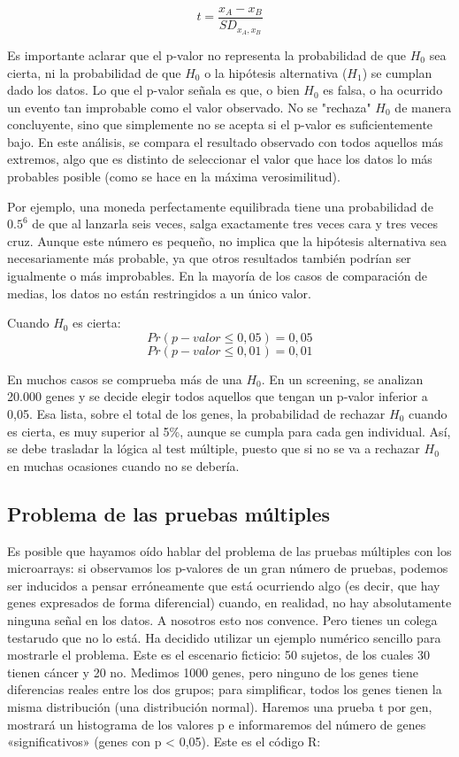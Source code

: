 \documentclass{config/apuntes}\usepackage[]{graphicx}\usepackage[]{xcolor}
\begin{document}
\[
t = \frac{x_A - x_B}{SD_{x_A, x_B}}
\]

Es importante aclarar que el p-valor no representa la probabilidad de que $H_0$ sea cierta, ni la probabilidad de que $H_0$ o la hipótesis alternativa ($H_1$) se cumplan dado los datos. Lo que el p-valor señala es que, o bien $H_0$ es falsa, o ha ocurrido un evento tan improbable como el valor observado. No se "rechaza" $H_0$ de manera concluyente, sino que simplemente no se acepta si el p-valor es suficientemente bajo. En este análisis, se compara el resultado observado con todos aquellos más extremos, algo que es distinto de seleccionar el valor que hace los datos lo más probables posible (como se hace en la máxima verosimilitud).

Por ejemplo, una moneda perfectamente equilibrada tiene una probabilidad de $0.5^6$ de que al lanzarla seis veces, salga exactamente tres veces cara y tres veces cruz. Aunque este número es pequeño, no implica que la hipótesis alternativa sea necesariamente más probable, ya que otros resultados también podrían ser igualmente o más improbables. En la mayoría de los casos de comparación de medias, los datos no están restringidos a un único valor.

Cuando $H_0$ es cierta:
$$Pr(p-valor \leq 0,05) = 0,05$$
$$Pr(p-valor \leq 0,01) = 0,01$$

En muchos casos se comprueba más de una $H_0$. En un screening, se analizan 20.000 genes y se decide elegir todos aquellos que tengan un p-valor inferior a 0,05. Esa lista, sobre el total de los genes, la probabilidad de rechazar $H_0$ cuando es cierta, es muy superior al 5\%, aunque se cumpla para cada gen individual. Así, se debe trasladar la lógica al test múltiple, puesto que si no se va a rechazar $H_0$ en muchas ocasiones cuando no se debería.

\subsection{Problema de las pruebas múltiples}
Es posible que hayamos oído hablar del problema de las pruebas múltiples con los microarrays: si observamos los p-valores de un gran número de pruebas, podemos ser inducidos a pensar erróneamente que está ocurriendo algo (es decir, que hay genes expresados de forma diferencial) cuando, en realidad, no hay absolutamente ninguna señal en los datos. A nosotros esto nos convence. Pero tienes un colega testarudo que no lo está. Ha decidido utilizar un ejemplo numérico sencillo para mostrarle el problema. Este es el escenario ficticio: 50 sujetos, de los cuales 30 tienen cáncer y 20 no. Medimos 1000 genes, pero ninguno de los genes tiene diferencias reales entre los dos grupos; para simplificar, todos los genes tienen la misma distribución (una distribución normal). Haremos una prueba t por gen, mostrará un histograma de los valores p e informaremos del número de genes «significativos» (genes con p < 0,05). Este es el código R:
\end{document}
